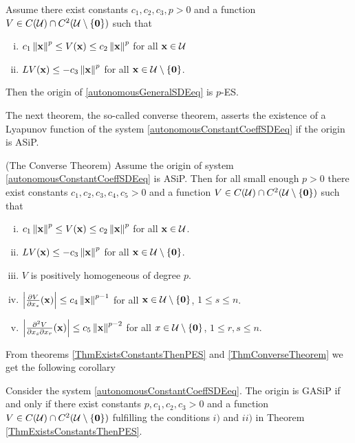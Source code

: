 \documentclass[a4paper,12pt,twoside,BCOR=10mm]{scrbook}
\begin{document}
\begin{theorem}\label{ThmExistsConstantsThenPES}
Assume there exist constants $c_1, c_2, c_3, p > 0$ and a function $V\in C(\mathcal{U})\cap C^2(\mathcal{U}\setminus \{\mathbf{0}\})$ such that
\begin{enumerate}[i)]
    \item $c_1\left\lVert\mathbf{x}\right\rVert^p \leq V(\mathbf{x}) \leq c_2\left\lVert\mathbf{x}\right\rVert^p$ for all $\mathbf{x} \in \mathcal{U}$
    \item $LV(\mathbf{x}) \leq -c_3\left\lVert\mathbf{x}\right\rVert^p$ for all $\mathbf{x} \in \mathcal{U} \setminus \{\mathbf{0}\}$.
\end{enumerate}
Then the origin of \eqref{autonomousGeneralSDEeq} is $p$-ES.
\end{theorem}

The next theorem, the so-called converse theorem, asserts the existence of a Lyapunov function of the system \eqref{autonomousConstantCoeffSDEeq} if the origin is ASiP.

\begin{theorem}(The Converse Theorem)\label{ThmConverseTheorem}
Assume the origin of system \eqref{autonomousConstantCoeffSDEeq} is ASiP. Then for all small enough $p > 0$ there exist constants $c_1,c_2,c_3,c_4,c_5 > 0$ and a function $V\in C(\mathcal{U})\cap C^2(\mathcal{U}\setminus \{\mathbf{0}\})$ such that
\begin{enumerate}[i)]
    \item $c_1\left\lVert\mathbf{x}\right\rVert_{}^{p} \leq V(\mathbf{x}) \leq c_2\left\lVert\mathbf{x}\right\rVert_{}^{p}$ for all $\mathbf{x} \in \mathcal{U}$.
    \item $LV(\mathbf{x}) \leq -c_3\left\lVert\mathbf{x}\right\rVert_{}^{p}$ for all $\mathbf{x} \in \mathcal{U}\setminus \{\mathbf{0}\}$.
    \item $V$ is positively homogeneous of degree $p$.
    \item $\left\lvert \frac{\partial V}{\partial x_s}(\mathbf{x})\right\rvert \leq c_4\left\lVert\mathbf{x}\right\rVert_{}^{p-1}$ for all $\mathbf{x}\in \mathcal{U}\setminus \{\mathbf{0}\}$, $1\leq s\leq n$.
    \item $\left\lvert \frac{\partial^2 V}{\partial x_s \partial x_r}(\mathbf{x})\right\rvert \leq c_5 \left\lVert\mathbf{x}\right\rVert_{}^{p - 2}$ for all $x\in\mathcal{U}\setminus \{\mathbf{0}\}$, $1\leq r,s\leq n$.
\end{enumerate}
\end{theorem}

From theorems \ref{ThmExistsConstantsThenPES} and \ref{ThmConverseTheorem} we get the following corollary

\begin{corollary}
Consider the system \eqref{autonomousConstantCoeffSDEeq}. The origin is GASiP if and only if there exist constants $p, c_1,c_2,c_3 > 0$ and a function $V\in C(\mathcal{U})\cap C^2(\mathcal{U}\setminus \{\mathbf{0}\})$ fulfilling the conditions $i)$ and $ii)$ in Theorem \ref{ThmExistsConstantsThenPES}.
\end{corollary}
\end{document}
